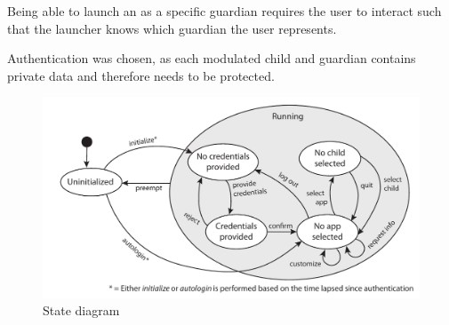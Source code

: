 Being able to launch an \girafapp[] as a specific guardian requires the user to interact such that the launcher knows which guardian the user represents.

Authentication was chosen, as each modulated child and guardian contains private data and therefore needs to be protected.





\begin{figure}[h]
	\centering
	\includegraphics[width=1\textwidth]{gfx/statediagram.pdf}
	\caption{State diagram}
	\label{fig:state_diagram}
\end{figure}


